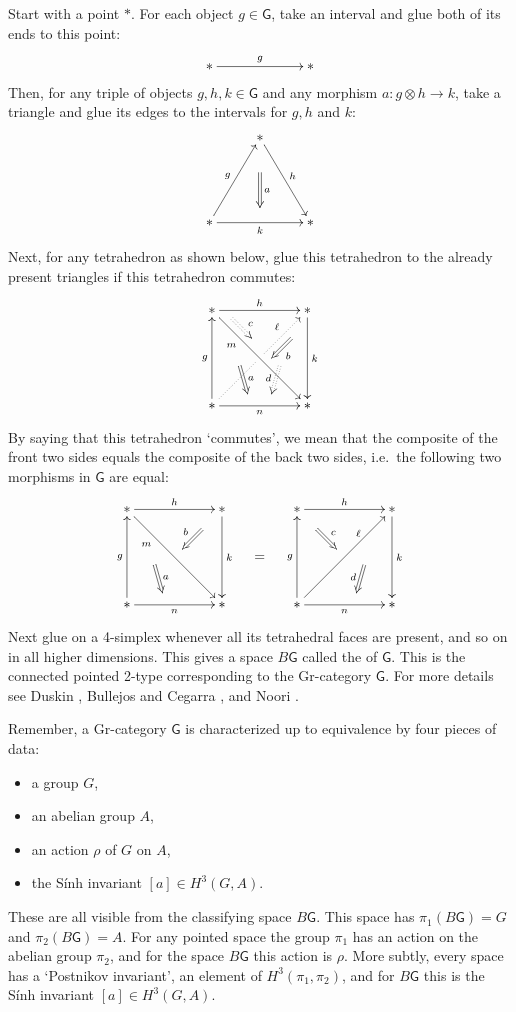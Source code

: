 \documentclass[reqno]{amsart}
\newcommand{\maps}{\colon}    %
\newcommand{\G}{{\mathsf{G}}}   %
\newcommand{\define}[1]{\textbf{\boldmath{#1}}}
\theoremstyle{definition}
\begin{document}
Start with a point $\ast$.  For each object $g \in \G$, take an interval and glue both of its ends to this point:
\[
\xy 0;/r3pc/:
   (0,0)*+{\ast}="x";
    (2,0)*+{\ast}="z";
 {\ar^{g} "x";"z"};
\endxy
\]
Then, for any triple of objects $g,h,k \in \G$ and any morphism $a \maps g \otimes h \to k$, take a triangle and glue its edges to the intervals for $g, h$ and $k$:
\[
\xy 0;/r3pc/:
   (0,0)*+{\ast}="x";
    (1,1.7)*+{\ast}="y";
    (2,0)*+{\ast}="z";
{\ar@2{->}^-{a} (1,1)*{};(1,0.3)*{}};
 {\ar^{g} "x";"y"};
 {\ar^{h} "y";"z"};
 {\ar_{k} "x";"z"};
\endxy
\]
Next, for any tetrahedron as shown below, glue this tetrahedron to the already present triangles if this tetrahedron commutes:
\[
{\xy 
(12,-12)*+{\ast}="1"; 
(12,12)*+{\ast}="2"; 
(-12,12)*+{\ast}="3"; 
(-12,-12)*+{\ast}="4"; 
(0,0)*+{}="0"; 
{\ar^-{k} "2";"1"}; 
{\ar^-{h} "3";"2"}; 
{\ar^-{g} "4";"3"};
{\ar_-{n} "4";"1"};
{\ar@{.>}^(0.5){\tiny{\ell}} "0";"2"};
{\ar@{.} "4";"0"};
{\ar_(0.3){m} "3";"1"};
{\ar@2{->}^-{a} (-5,-2)*{};(-3,-9)*{}};
{\ar@2{->}^-{b} (8,5)*{};(3,0)*{}};
{\ar@2{.>}^(0.6){c} (-7,10)*{};(-2,5)*{}};
{\ar@2{.>}_-{d} (5,-2)*{};(3,-9)*{}};
\endxy}
\]
\noindent
By saying that this tetrahedron `commutes', we mean that the composite
of the front two sides equals the composite of the back two sides, i.e.\ the following two morphisms in $\G$ are equal:
\[
{\xy 
(12,-12)*+{\ast}="1"; 
(12,12)*+{\ast}="2"; 
(-12,12)*+{\ast}="3"; 
(-12,-12)*+{\ast}="4"; 
{\ar^-{k} "2";"1"}; 
{\ar^-{h} "3";"2"}; 
{\ar^-{g} "4";"3"};
{\ar_-{n} "4";"1"};
{\ar_(0.3){m} "3";"1"};
{\ar@2{->}^-{a} (-5,-2)*{};(-3,-9)*{}};
{\ar@2{->}_-{b} (7,7)*{};(2,2)*{}};
\endxy}
\quad = \quad
{\xy 
(12,-12)*+{\ast}="1"; 
(12,12)*+{\ast}="2"; 
(-12,12)*+{\ast}="3"; 
(-12,-12)*+{\ast}="4"; 
{\ar^-{k} "2";"1"}; 
{\ar^-{h} "3";"2"}; 
{\ar^-{g} "4";"3"};
{\ar_-{n} "4";"1"};
{\ar_{} "4";"2"}; 
(3.5,6)*+{\scriptstyle{\ell}};
{\ar@2{->}^(0.5){c} (-7,7)*{};(-2,2)*{}};
{\ar@2{->}_-{d} (5,-2)*{};(3,-9)*{}};
\endxy}
\]
Next  glue on a 4-simplex whenever all its tetrahedral faces are present, and so on in all higher dimensions. This gives a space $B\G$ called the \define{classifying space} of $\G$.  This is the connected pointed 2-type corresponding to the Gr-category $\G$.  For more details see Duskin \cite{D01}, Bullejos and Cegarra \cite{BC03}, and Noori \cite{N08}.

Remember, a Gr-category $\G$ is characterized up to equivalence by four pieces of data:
\begin{itemize}
\item a group $G$,
\item an abelian group $A$,
\item an action $\rho$ of $G$ on $A$,
\item the S\'inh invariant $[a] \in H^3(G,A)$.
\end{itemize}
These are all visible from the classifying space $B\G$.  This space has $\pi_1(B\G) = G$ and $\pi_2(B\G) = A$.  For any pointed space the group $\pi_1$ has an action on the abelian group $\pi_2$, and for the space $B\G$ this action is $\rho$.  More subtly, every space has a `Postnikov invariant', an element of $H^3(\pi_1,\pi_2)$, and for $B\G$ this is the S\'inh invariant $[a] \in H^3(G,A)$.
\end{document}
